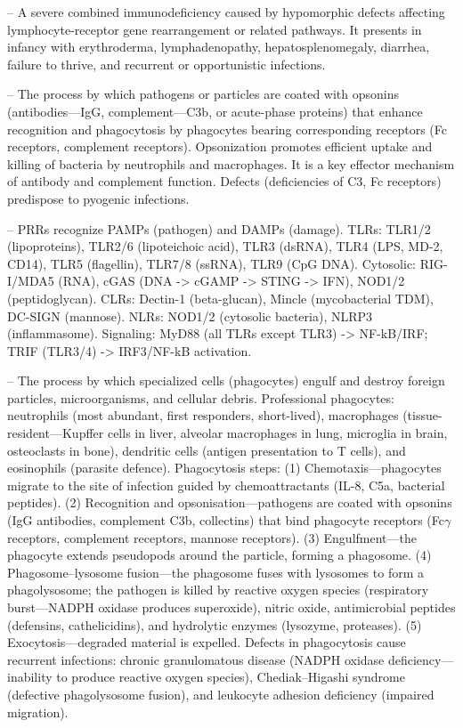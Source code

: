 -- A severe combined immunodeficiency caused by hypomorphic defects affecting lymphocyte-receptor gene rearrangement or related pathways. It presents in infancy with erythroderma, lymphadenopathy, hepatosplenomegaly, diarrhea, failure to thrive, and recurrent or opportunistic infections.

-- The process by which pathogens or particles are coated with opsonins (antibodies—IgG, complement—C3b, or acute-phase proteins) that enhance recognition and phagocytosis by phagocytes bearing corresponding receptors (Fc receptors, complement receptors). Opsonization promotes efficient uptake and killing of bacteria by neutrophils and macrophages. It is a key effector mechanism of antibody and complement function. Defects (deficiencies of C3, Fc receptors) predispose to pyogenic infections.

-- PRRs recognize PAMPs (pathogen) and DAMPs (damage). TLRs: TLR1/2 (lipoproteins), TLR2/6 (lipoteichoic acid), TLR3 (dsRNA), TLR4 (LPS, MD-2, CD14), TLR5 (flagellin), TLR7/8 (ssRNA), TLR9 (CpG DNA). Cytosolic: RIG-I/MDA5 (RNA), cGAS (DNA -> cGAMP -> STING -> IFN), NOD1/2 (peptidoglycan). CLRs: Dectin-1 (beta-glucan), Mincle (mycobacterial TDM), DC-SIGN (mannose). NLRs: NOD1/2 (cytosolic bacteria), NLRP3 (inflammasome). Signaling: MyD88 (all TLRs except TLR3) -> NF-kB/IRF; TRIF (TLR3/4) -> IRF3/NF-kB activation.

-- The process by which specialized cells (phagocytes) engulf and destroy foreign particles, microorganisms, and cellular debris. Professional phagocytes: neutrophils (most abundant, first responders, short-lived), macrophages (tissue-resident—Kupffer cells in liver, alveolar macrophages in lung, microglia in brain, osteoclasts in bone), dendritic cells (antigen presentation to T cells), and eosinophils (parasite defence). Phagocytosis steps: (1) Chemotaxis—phagocytes migrate to the site of infection guided by chemoattractants (IL-8, C5a, bacterial peptides). (2) Recognition and opsonisation—pathogens are coated with opsonins (IgG antibodies, complement C3b, collectins) that bind phagocyte receptors (Fc\(\gamma\) receptors, complement receptors, mannose receptors). (3) Engulfment—the phagocyte extends pseudopods around the particle, forming a phagosome. (4) Phagosome–lysosome fusion—the phagosome fuses with lysosomes to form a phagolysosome; the pathogen is killed by reactive oxygen species (respiratory burst—NADPH oxidase produces superoxide), nitric oxide, antimicrobial peptides (defensins, cathelicidins), and hydrolytic enzymes (lysozyme, proteases). (5) Exocytosis—degraded material is expelled. Defects in phagocytosis cause recurrent infections: chronic granulomatous disease (NADPH oxidase deficiency—inability to produce reactive oxygen species), Chediak–Higashi syndrome (defective phagolysosome fusion), and leukocyte adhesion deficiency (impaired migration).

